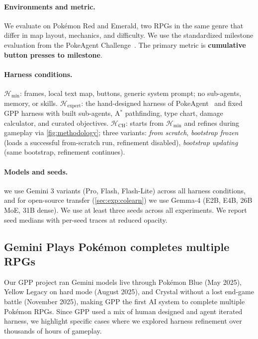 \documentclass[11pt]{article}
\begin{document}
\paragraph{Environments and metric.} We evaluate on Pok\'emon Red and Emerald, two RPGs in the same genre that differ in map layout, mechanics, and difficulty. We use the standardized milestone evaluation from the PokeAgent Challenge~\citep{karten2026pokeagent}. The primary metric is \textbf{cumulative button presses to milestone}.

\paragraph{Harness conditions.} $\mathcal{H}_{\min}$: frames, local text map, buttons, generic system prompt; no sub-agents, memory, or skills. $\mathcal{H}_\mathrm{expert}$: the hand-designed harness of PokeAgent~\citep{karten2026pokeagent} and fixed GPP harness with built sub-agents, A$^*$ pathfinding, type chart, damage calculator, and curated objectives. $\mathcal{H}_\mathrm{CH}$: starts from $\mathcal{H}_{\min}$ and refines during gameplay via \cref{fig:methodology}; three variants: \emph{from scratch}, \emph{bootstrap frozen} (loads a successful from-scratch run, refinement disabled), \emph{bootstrap updating} (same bootstrap, refinement continues).

\paragraph{Models and seeds.} we use Gemini 3 variants (Pro, Flash, Flash-Lite) across all harness conditions, and for open-source transfer (\cref{sec:exp:colearn}) we use Gemma-4 (E2B, E4B, 26B MoE, 31B dense). We use at least three seeds across all experiments. We report seed medians with per-seed traces at reduced opacity.

\subsection{Gemini Plays Pok\'emon completes multiple RPGs}\label{sec:exp:gpp}

Our GPP project ran Gemini models live through Pok\'emon Blue (May 2025), Yellow Legacy on hard mode (August 2025), and Crystal without a lost end-game battle (November 2025), making GPP the first AI system to complete multiple Pok\'emon RPGs. Since GPP used a mix of human designed and agent iterated harness, we highlight specific cases where we explored harness refinement over thousands of hours of gameplay.
\end{document}
